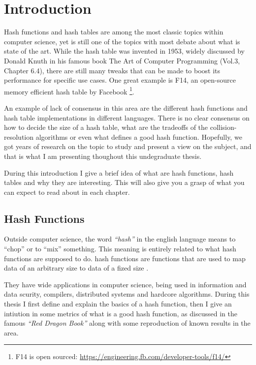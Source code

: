 \chapter{Introduction}
\label{cap:Introduction}

Hash functions and hash tables are among the most classic topics within computer science, yet is still one of the topics with most debate about what is state of the art. While the hash table was invented in 1953, widely discussed by Donald Knuth in his famous book The Art of Computer Programming (Vol.3, Chapter 6.4), there are still many tweaks that can be made to boost its performance for specific use cases. One great example is F14, an open-source memory efficient hash table by Facebook \footnote{F14 is open sourced: \url{https://engineering.fb.com/developer-tools/f14/}}.

An example of lack of consensus in this area are the different hash functions and hash table implementations in different languages. There is no clear consensus on how to decide the size of a hash table, what are the tradeoffs of the collision-resolution algorithms or even what defines a good hash function. Hopefully, we got years of research on the topic to study and present a view on the subject, and that is what I am presenting thoughout this undegraduate thesis.

During this introduction I give a brief idea of what are hash functions, hash tables and why they are interesting. This will also give you a grasp of what you can expect to read about in each chapter.

\section{Hash Functions}

Outside computer science, the word \textit{``hash''} in the english language means to ``chop'' or to ``mix'' something. This meaning is entirely related to what hash functions are supposed to do. hash functions are functions that are used to map data of an arbitrary size to data of a fized size \cite{HashFuncWiki}.

They have wide applications in computer science, being used in information and data scurity, compilers, distributed systems and hardcore algorithms. During this thesis I first define and explain the basics of a hash function, then I give an intiution in some metrics of what is a good hash function, as discussed in the famous \textit{``Red Dragon Book''} \cite{DragonBook} along with some reproduction of known results in the area.

